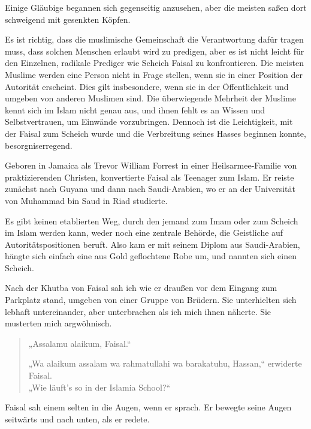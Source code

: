 \documentclass[12pt]{memoir}
\def\–{\hskip0pt-\hskip0pt}
\begin{document}
Einige Gläubige begannen sich gegenseitig anzusehen,
aber die meisten saßen dort schweigend mit gesenkten Köpfen.

Es ist richtig,
dass die muslimische Gemeinschaft die Verantwortung dafür tragen muss,
dass solchen Menschen erlaubt wird zu predigen,
aber es ist nicht leicht für den Einzelnen,
radikale Prediger wie Scheich Faisal zu konfrontieren.
Die meisten Muslime werden eine Person nicht in Frage stellen,
wenn sie in einer Position der Autorität erscheint.
Dies gilt insbesondere, wenn sie in der Öffentlichkeit und
umgeben von anderen Muslimen sind.
Die überwiegende Mehrheit der Muslime kennt sich im Islam nicht genau aus,
und ihnen fehlt es an Wissen und Selbstvertrauen, um Einwände vorzubringen.
Dennoch ist die Leichtigkeit, mit der Faisal zum Scheich wurde und
die Verbreitung seines Hasses beginnen konnte, besorgniserregend.

Geboren in Jamaica als Trevor William Forrest
in einer Heilsarmee\–Familie von praktizierenden Christen,
konvertierte Faisal als Teenager zum Islam.
Er reiste zunächst nach Guyana und dann nach Saudi\–Arabien,
wo er an der Universität von Muhammad bin Saud in Riad studierte.

Es gibt keinen etablierten Weg,
durch den jemand zum Imam oder zum Scheich im Islam werden kann,
weder noch eine zentrale Behörde,
die Geistliche auf Autoritätspositionen beruft.
Also kam er mit seinem Diplom aus Saudi\–Arabien,
hängte sich einfach eine aus Gold geflochtene Robe um,
und nannten sich einen Scheich.

Nach der Khutba von Faisal sah ich wie er draußen
vor dem Eingang zum Parkplatz stand,
umgeben von einer Gruppe von Brüdern.
Sie unterhielten sich lebhaft untereinander,
aber unterbrachen als ich mich ihnen näherte.
Sie musterten mich argwöhnisch.

\begin{quote}
„Assalamu alaikum, Faisal.“

„Wa alaikum assalam wa rahmatullahi wa barakatuhu, Hassan,“ erwiderte Faisal.\\
„Wie läuft’s so in der Islamia School?“
\end{quote}

Faisal sah einem selten in die Augen, wenn er sprach.
Er bewegte seine Augen seitwärts und nach unten, als er redete.
\end{document}
